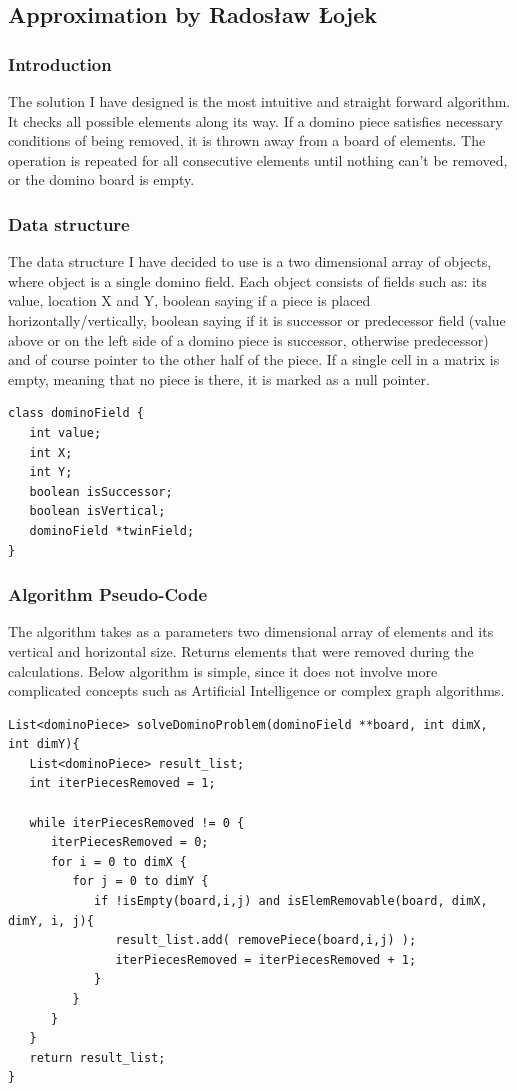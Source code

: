 \subsection{Approximation by Radosław Łojek}

\subsubsection{Introduction}
The solution I have designed is the most intuitive and straight forward algorithm. It checks all
possible elements along its way. If a domino piece satisfies necessary conditions of being removed,
it is thrown away from a board of elements. The operation is repeated for all consecutive elements
until nothing can't be removed, or the domino board is empty.

\subsubsection{Data structure}
The data structure I have decided to use is a two dimensional array of objects, where object is a
single domino field. Each object consists of fields such as: its value, location X and Y, boolean
saying if a piece is placed horizontally/vertically, boolean saying if it is successor or
predecessor field (value above or on the left side of a domino piece is successor, otherwise
predecessor) and of course pointer to the other half of the piece. If a single cell in a matrix is
empty, meaning that no piece is there, it is marked as a null pointer.
\\
\begin{verbatim}
class dominoField {
   int value;
   int X;
   int Y; 
   boolean isSuccessor;
   boolean isVertical; 
   dominoField *twinField; 
}
\end{verbatim}


\subsubsection{Algorithm Pseudo-Code}
The algorithm takes as a parameters two dimensional array of elements and its vertical and
horizontal size. Returns elements that were removed during the calculations. Below algorithm is
simple, since it does not involve more complicated concepts such as Artificial Intelligence or
complex graph algorithms.
\\
\begin{verbatim}
List<dominoPiece> solveDominoProblem(dominoField **board, int dimX, int dimY){
   List<dominoPiece> result_list;
   int iterPiecesRemoved = 1;
   
   while iterPiecesRemoved != 0 {
      iterPiecesRemoved = 0;
      for i = 0 to dimX {
         for j = 0 to dimY {
            if !isEmpty(board,i,j) and isElemRemovable(board, dimX, dimY, i, j){ 
               result_list.add( removePiece(board,i,j) );
               iterPiecesRemoved = iterPiecesRemoved + 1;
            }
         }
      }
   }
   return result_list;
}
\end{verbatim}

